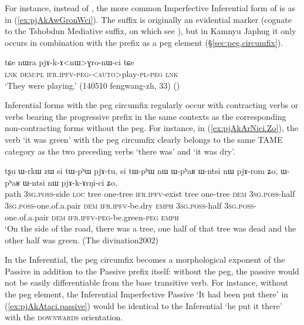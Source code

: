 For instance, instead of , the more common Imperfective Inferential form of   is  as in (\ref{ex:pjAkAwGronWci}). The  suffix is originally an evidential marker (cognate to the Tshobdun   Mediative suffix, on which see \citealt[564]{jackson17tshobdun}), but in Kamnyu Japhug it only occurs in combination with the  prefix as a peg element (§\ref{sec:peg.circumfix}).

\begin{exe}
\ex \label{ex:pjAkAwGronWci}
 \gll  tɕe nɯra pjɤ-k-ɤ<nɯ>ɣro-nɯ-ci tɕe \\
 \textsc{lnk} \textsc{dem}:\textsc{pl} \textsc{ifr}.\textsc{ipfv}-\textsc{peg}-<\textsc{auto}>play-\textsc{pl}-\textsc{peg} \textsc{lnk} \\
 \glt `They were playing.' (140510 fengwang-zh, 33) ()
\end{exe}

Inferential forms with the peg circumfix   regularly occur with contracting verbs or verbs bearing the progressive prefix in the same contexts as the corresponding non-contracting forms without the peg. For instance, in (\ref{ex:pjAkArNici.Zo}), the verb  `it was green' with the peg circumfix clearly belongs to the same TAME category as the two preceding verbs   `there was' and  `it was dry'. 
 
\begin{exe}
\ex \label{ex:pjAkArNici.Zo}
 \gll  tʂu ɯ-rkɯ zɯ si tɯ-pʰɯ pjɤ-tu,  si tɯ-pʰɯ nɯ ɯ-pʰaʁ ɯ-ntsi nɯ pjɤ-rom ʑo, ɯ-pʰaʁ ɯ-ntsi nɯ pjɤ-k-ɤrŋi-ci ʑo,\\
path \textsc{3sg}.\textsc{poss}-side \textsc{loc} tree one-tree \textsc{ifr}.\textsc{ipfv}-exist tree one-tree \textsc{dem} \textsc{3sg}.\textsc{poss}-half \textsc{3sg}.\textsc{poss}-one.of.a.pair \textsc{dem} \textsc{ifr}.\textsc{ipfv}-be.dry \textsc{emph} \textsc{3sg}.\textsc{poss}-half \textsc{3sg}.\textsc{poss}-one.of.a.pair \textsc{dem} \textsc{ifr}.\textsc{ipfv}-\textsc{peg}-be.green-\textsc{peg} \textsc{emph}\\
\glt `On the side of the road, there was a tree, one half of that tree was dead and the other half was green. (The divination2002)
\end{exe}

In the Inferential, the peg circumfix becomes a morphological exponent of the Passive in addition to the Passive prefix  itself: without the peg, the passive would not be easily differentiable from the base transitive verb. For instance, without the peg element, the Inferential Imperfective Passive  `It had been put there' in (\ref{ex:pjAkAtaci.passive}) would be identical to the Inferential  `he put it there' with the \textsc{downwards} orientation.


